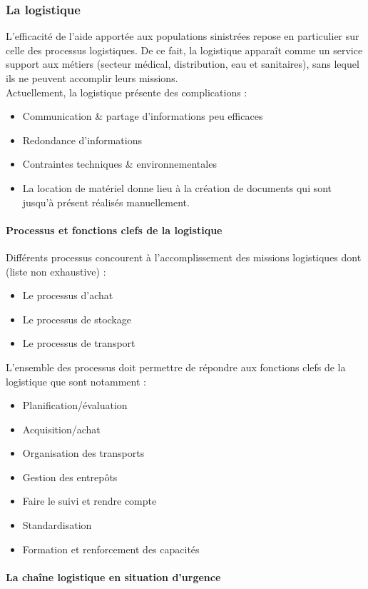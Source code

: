 \documentclass[11pt,fleqn]{book} %
\begin{document}
\subsubsection{La logistique}
L'efficacité de l'aide apportée aux populations sinistrées repose en particulier sur celle des processus logistiques. De ce fait, la logistique apparaît comme un service support aux métiers (secteur médical, distribution, eau et sanitaires), sans lequel ils ne peuvent accomplir leurs missions.
\\
Actuellement, la logistique présente des complications :
\begin{itemize}
\item Communication \& partage d'informations peu efficaces
\item Redondance d'informations
\item Contraintes techniques \& environnementales
\item La location de matériel donne lieu à la création de documents qui sont jusqu'à présent réalisés manuellement.
\end{itemize}

\paragraph{Processus et fonctions clefs de la logistique}
Différents processus concourent à l'accomplissement des missions logistiques dont (liste non exhaustive) :
\begin{itemize}
\item Le processus d'achat
\item Le processus de stockage
\item Le processus de transport
\end{itemize}
L'ensemble des processus doit permettre de répondre aux fonctions clefs de la logistique que sont notamment :
\begin{itemize}
\item Planification/évaluation
\item Acquisition/achat
\item Organisation des transports
\item Gestion des entrepôts
\item Faire le suivi et rendre compte
\item Standardisation
\item Formation et renforcement des capacités
\end{itemize}

\paragraph{La chaîne logistique en situation d'urgence}
\end{document}
